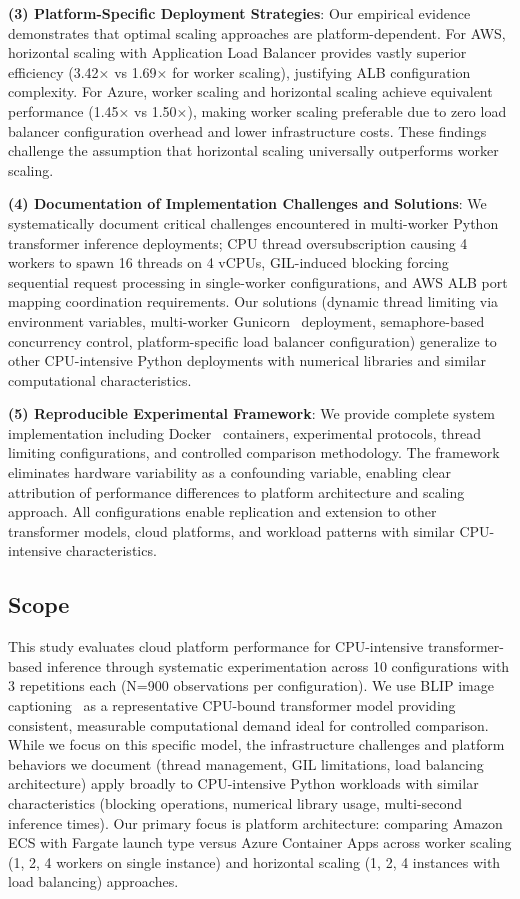 \textbf{(3) Platform-Specific Deployment Strategies}: Our empirical evidence demonstrates that optimal scaling approaches are platform-dependent. For AWS, horizontal scaling with Application Load Balancer provides vastly superior efficiency (3.42× vs 1.69× for worker scaling), justifying ALB configuration complexity. For Azure, worker scaling and horizontal scaling achieve equivalent performance (1.45× vs 1.50×), making worker scaling preferable due to zero load balancer configuration overhead and lower infrastructure costs. These findings challenge the assumption that horizontal scaling universally outperforms worker scaling.

\textbf{(4) Documentation of Implementation Challenges and Solutions}: We systematically document critical challenges encountered in multi-worker Python transformer inference deployments; CPU thread oversubscription causing 4 workers to spawn 16 threads on 4 vCPUs, GIL-induced blocking forcing sequential request processing in single-worker configurations, and AWS ALB port mapping coordination requirements. Our solutions (dynamic thread limiting via environment variables, multi-worker Gunicorn~\cite{gunicorn2023docs} deployment, semaphore-based concurrency control, platform-specific load balancer configuration) generalize to other CPU-intensive Python deployments with numerical libraries and similar computational characteristics.

\textbf{(5) Reproducible Experimental Framework}: We provide complete system implementation including Docker~\cite{docker2024} containers, experimental protocols, thread limiting configurations, and controlled comparison methodology. The framework eliminates hardware variability as a confounding variable, enabling clear attribution of performance differences to platform architecture and scaling approach. All configurations enable replication and extension to other transformer models, cloud platforms, and workload patterns with similar CPU-intensive characteristics.

\subsection{Scope}

This study evaluates cloud platform performance for CPU-intensive transformer-based inference through systematic experimentation across 10 configurations with 3 repetitions each (N=900 observations per configuration). We use BLIP image captioning~\cite{li2022blip} as a representative CPU-bound transformer model providing consistent, measurable computational demand ideal for controlled comparison. While we focus on this specific model, the infrastructure challenges and platform behaviors we document (thread management, GIL limitations, load balancing architecture) apply broadly to CPU-intensive Python workloads with similar characteristics (blocking operations, numerical library usage, multi-second inference times). Our primary focus is platform architecture: comparing Amazon ECS with Fargate launch type versus Azure Container Apps across worker scaling (1, 2, 4 workers on single instance) and horizontal scaling (1, 2, 4 instances with load balancing) approaches.

